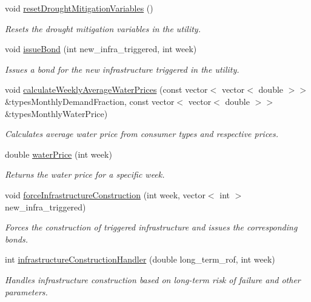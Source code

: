 \begin{DoxyCompactItemize}
void \mbox{\hyperlink{classUtility_af9ec9c2cb69166db021f03ce9ddf4d8e}{reset\+Drought\+Mitigation\+Variables}} ()
\begin{DoxyCompactList}\small\item\em Resets the drought mitigation variables in the utility. \end{DoxyCompactList}\item 
void \mbox{\hyperlink{classUtility_a152ceea2917ea7715e8fbf8aff24390f}{issue\+Bond}} (int new\+\_\+infra\+\_\+triggered, int week)
\begin{DoxyCompactList}\small\item\em Issues a bond for the new infrastructure triggered in the utility. \end{DoxyCompactList}\item 
void \mbox{\hyperlink{classUtility_a0189edb631c9596f094b15afeeb934fd}{calculate\+Weekly\+Average\+Water\+Prices}} (const vector$<$ vector$<$ double $>$$>$ \&types\+Monthly\+Demand\+Fraction, const vector$<$ vector$<$ double $>$$>$ \&types\+Monthly\+Water\+Price)
\begin{DoxyCompactList}\small\item\em Calculates average water price from consumer types and respective prices. \end{DoxyCompactList}\item 
double \mbox{\hyperlink{classUtility_a0dca2586b9ed761cdab3b0a344daf21c}{water\+Price}} (int week)
\begin{DoxyCompactList}\small\item\em Returns the water price for a specific week. \end{DoxyCompactList}\item 
void \mbox{\hyperlink{classUtility_a7daa5b948a370eca83bc8c63890f6b19}{force\+Infrastructure\+Construction}} (int week, vector$<$ int $>$ new\+\_\+infra\+\_\+triggered)
\begin{DoxyCompactList}\small\item\em Forces the construction of triggered infrastructure and issues the corresponding bonds. \end{DoxyCompactList}\item 
int \mbox{\hyperlink{classUtility_ae93114986578d3d3fbae56f271ac7df6}{infrastructure\+Construction\+Handler}} (double long\+\_\+term\+\_\+rof, int week)
\begin{DoxyCompactList}\small\item\em Handles infrastructure construction based on long-\/term risk of failure and other parameters. \end{DoxyCompactList}\item 

\end{DoxyCompactItemize}
